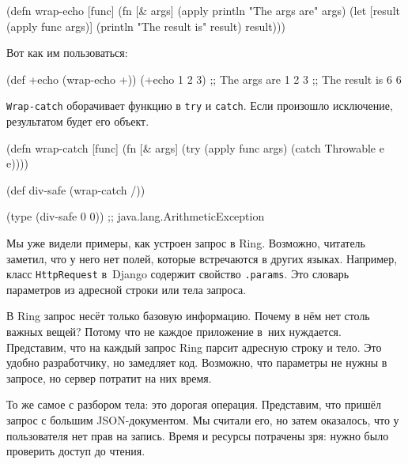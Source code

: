 \begin{english}
  \begin{clojure}
(defn wrap-echo [func]
  (fn [& args]
    (apply println "The args are" args)
    (let [result (apply func args)]
      (println "The result is" result)
      result)))
  \end{clojure}
\end{english}

Вот как им пользоваться:

\begin{english}
  \begin{clojure}
(def +echo (wrap-echo +))
(+echo 1 2 3)
;; The args are 1 2 3
;; The result is 6
6
  \end{clojure}
\end{english}


\verb|Wrap-catch| оборачивает функцию в \verb|try| и \verb|catch|. Если
произошло исключение, результатом будет его объект.

\begin{english}
  \begin{clojure}
(defn wrap-catch [func]
  (fn [& args]
    (try
      (apply func args)
      (catch Throwable e
        e))))

(def div-safe (wrap-catch /))

(type (div-safe 0 0))
;; java.lang.ArithmeticException
  \end{clojure}
\end{english}


Мы уже видели примеры, как устроен запрос в Ring. Возможно, читатель заметил,
что у него нет полей, которые встречаются в других языках. Например, класс
\verb|HttpRequest| в~Django содержит свойство \verb|.params|. Это словарь
параметров из адресной строки или тела запроса.

В Ring запрос несёт только базовую информацию. Почему в нём нет столь важных
вещей? Потому что не каждое приложение в~них нуждается. Представим, что на
каждый запрос Ring парсит адресную строку и тело. Это удобно разработчику, но
замедляет код. Возможно, что параметры не нужны в запросе, но сервер потратит на
них время.

То же самое с разбором тела: это дорогая операция. Представим, что пришёл запрос
с большим JSON-документом. Мы считали его, но затем оказалось, что у
пользователя нет прав на запись. Время и ресурсы потрачены зря: нужно было
проверить доступ до чтения.

